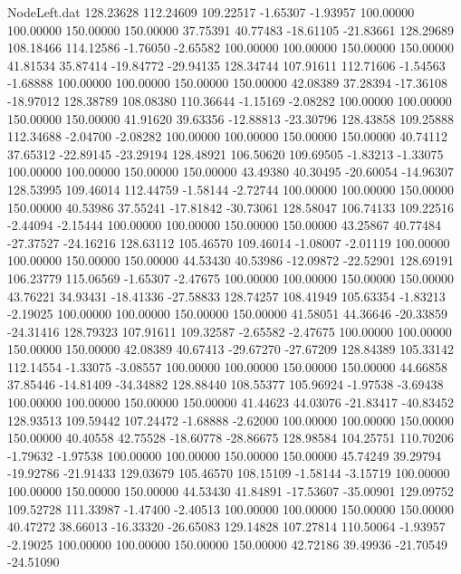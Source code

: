 \begin{filecontents}{NodeLeft.dat}
 128.23628  112.24609  109.22517    -1.65307   -1.93957  100.00000  100.00000  150.00000  150.00000   37.75391   40.77483  -18.61105  -21.83661
 128.29689  108.18466  114.12586    -1.76050   -2.65582  100.00000  100.00000  150.00000  150.00000   41.81534   35.87414  -19.84772  -29.94135
 128.34744  107.91611  112.71606    -1.54563   -1.68888  100.00000  100.00000  150.00000  150.00000   42.08389   37.28394  -17.36108  -18.97012
 128.38789  108.08380  110.36644    -1.15169   -2.08282  100.00000  100.00000  150.00000  150.00000   41.91620   39.63356  -12.88813  -23.30796
 128.43858  109.25888  112.34688    -2.04700   -2.08282  100.00000  100.00000  150.00000  150.00000   40.74112   37.65312  -22.89145  -23.29194
 128.48921  106.50620  109.69505    -1.83213   -1.33075  100.00000  100.00000  150.00000  150.00000   43.49380   40.30495  -20.60054  -14.96307
 128.53995  109.46014  112.44759    -1.58144   -2.72744  100.00000  100.00000  150.00000  150.00000   40.53986   37.55241  -17.81842  -30.73061
 128.58047  106.74133  109.22516    -2.44094   -2.15444  100.00000  100.00000  150.00000  150.00000   43.25867   40.77484  -27.37527  -24.16216
 128.63112  105.46570  109.46014    -1.08007   -2.01119  100.00000  100.00000  150.00000  150.00000   44.53430   40.53986  -12.09872  -22.52901
 128.69191  106.23779  115.06569    -1.65307   -2.47675  100.00000  100.00000  150.00000  150.00000   43.76221   34.93431  -18.41336  -27.58833
 128.74257  108.41949  105.63354    -1.83213   -2.19025  100.00000  100.00000  150.00000  150.00000   41.58051   44.36646  -20.33859  -24.31416
 128.79323  107.91611  109.32587    -2.65582   -2.47675  100.00000  100.00000  150.00000  150.00000   42.08389   40.67413  -29.67270  -27.67209
 128.84389  105.33142  112.14554    -1.33075   -3.08557  100.00000  100.00000  150.00000  150.00000   44.66858   37.85446  -14.81409  -34.34882
 128.88440  108.55377  105.96924    -1.97538   -3.69438  100.00000  100.00000  150.00000  150.00000   41.44623   44.03076  -21.83417  -40.83452
 128.93513  109.59442  107.24472    -1.68888   -2.62000  100.00000  100.00000  150.00000  150.00000   40.40558   42.75528  -18.60778  -28.86675
 128.98584  104.25751  110.70206    -1.79632   -1.97538  100.00000  100.00000  150.00000  150.00000   45.74249   39.29794  -19.92786  -21.91433
 129.03679  105.46570  108.15109    -1.58144   -3.15719  100.00000  100.00000  150.00000  150.00000   44.53430   41.84891  -17.53607  -35.00901
 129.09752  109.52728  111.33987    -1.47400   -2.40513  100.00000  100.00000  150.00000  150.00000   40.47272   38.66013  -16.33320  -26.65083
 129.14828  107.27814  110.50064    -1.93957   -2.19025  100.00000  100.00000  150.00000  150.00000   42.72186   39.49936  -21.70549  -24.51090

\end{filecontents}
